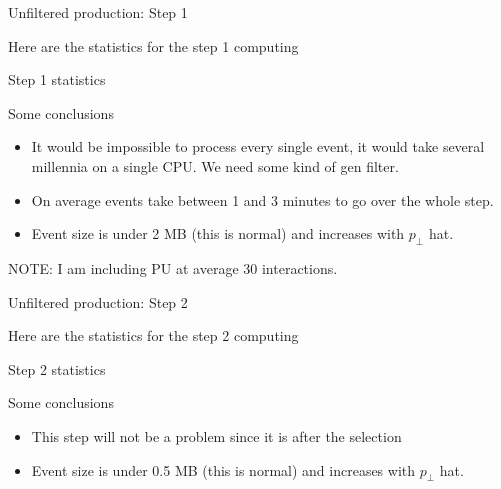 \documentclass[8pt]{beamer}
\begin{document}
\begin{frame}{Unfiltered production: Step 1}
 
Here are the statistics for the step 1 computing
 
\begin{block}{Step 1 statistics}



\end{block}

Some conclusions
\begin{itemize}
  \item It would be impossible to process every single event, it would take several millennia on a single CPU. We need some kind of gen filter.
  \item On average events take between 1 and 3 minutes to go over the whole step.
  \item Event size is under 2 MB (this is normal) and increases with $p_\perp$ hat.
\end{itemize}

NOTE: I am including PU at average 30 interactions.

\end{frame}

\begin{frame}{Unfiltered production: Step 2}
 
Here are the statistics for the step 2 computing
 
\begin{block}{Step 2 statistics}



\end{block}

Some conclusions
\begin{itemize}
  \item This step will not be a problem since it is after the selection
  \item Event size is under 0.5 MB (this is normal) and increases with $p_\perp$ hat.
\end{itemize}


\end{frame}
\end{document}
